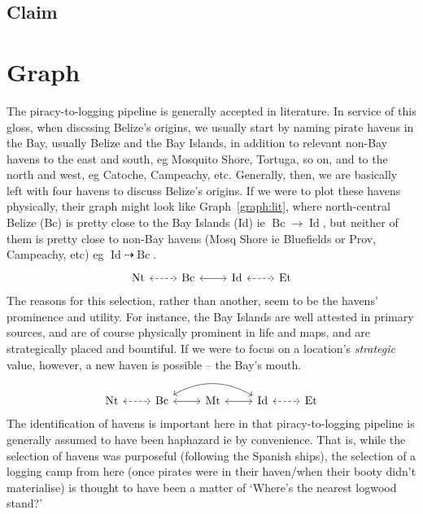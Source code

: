 \documentclass{amsart}
\DeclareMathOperator{\id}{Id}%
\DeclareMathOperator{\mt}{Mt}%
\DeclareMathOperator{\bc}{Bc}%
\DeclareMathOperator{\et}{Et}%
\DeclareMathOperator{\nt}{Nt}%
\theoremstyle{definition}%
\theoremstyle{definition}%
\theoremstyle{remark}%
\begin{document}
\subsection{Claim}
\label{ss:claim}
%
%
%
%
\section{Graph}
\label{s:graph}
The piracy-to-logging pipeline is generally accepted in literature. In service of this gloss, when discssing Belize's origins, we usually start by naming pirate havens in the Bay, usually Belize and the Bay Islands, in addition to relevant non-Bay havens to the east and south, eg Mosquito Shore, Tortuga, so on, and to the north and west, eg Catoche, Campeachy, etc. Generally, then, we are basically left with four havens to discuss Belize's origins. If we were to plot these havens physically, their graph might look like Graph~\ref{graph:lit}, where north-central Belize (Bc) is pretty close to the Bay Islands (Id) ie \(\bc\to\id\), but neither of them is pretty close to non-Bay havens (Mosq Shore ie Bluefields or Prov, Campeachy, etc) eg \(\id\dashrightarrow\bc\).
%
\begin{equation}
\label{graph:lit}%
\begin{tikzcd}[arrows=leftrightarrow]
\nt \rar[dashed] &\bc \rar &\id \rar[dashed] &\et
\end{tikzcd}
\end{equation}
%
The reasons for this selection, rather than another, seem to be the havens' prominence and utility. For instance, the Bay Islands are well attested in primary sources, and are of course physically prominent in life and maps, and are strategically placed and bountiful. If we were to focus on a location's \emph{strategic} value, however, a new haven is possible -- the Bay's mouth.
%
\begin{equation}
\label{graph:prop}%
\begin{tikzcd}[arrows=leftrightarrow]
\nt \rar[dashed] &\bc \rar \ar[rr,bend left] &\mt \rar &\id \rar[dashed] &\et
\end{tikzcd}
\end{equation}
%
The identification of havens is important here in that piracy-to-logging pipeline is generally assumed to have been haphazard ie by convenience. That is, while the selection of havens was purposeful (following the Spanish ships), the selection of a logging camp from here (once pirates were in their haven/when their booty didn't materialise) is thought to have been a matter of `Where's the nearest logwood stand?' %
\end{document}
